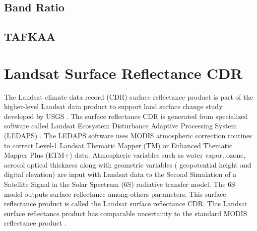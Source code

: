 \subsection{Band Ratio}


\subsection{TAFKAA}
\section{Landsat Surface Reflectance CDR}
\label{sec:CDR} 
The Landsat climate data record (CDR) surface reflectance product is part of the higher-level Landsat data product to support land surface change study developed by USGS \cite{LandsatCDR}. The surface reflectance CDR is generated from specialized software called Landsat Ecosystem Disturbance Adaptive Processing System (LEDAPS) \cite{Masek:2006}. The LEDAPS software uses MODIS atmospheric correction routines to correct Level-1 Landsat Thematic Mapper (TM) or Enhanced Thematic Mapper Plus (ETM+) data. Atmospheric variables such as water vapor, ozone, aerosol optical thickness along with geometric variables ({ geopotential height} and digital elevation) are input with Landsat data to the Second Simulation of a Satellite Signal in the Solar Spectrum (6S) radiative transfer model. The 6S model outputs surface reflectance among others parameters. This surface reflectance product is called the Landsat surface reflectance CDR. This Landsat surface reflectance product has comparable uncertainty to the standard MODIS reflectance product \cite{Masek:2006}.

